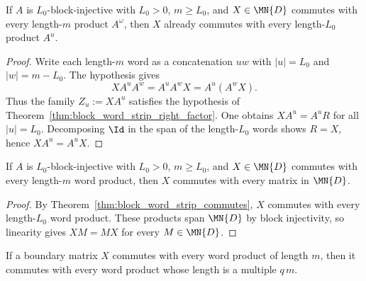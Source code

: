 \begin{theorem}
    \label{thm:block_word_strip_commutes}
    \leanok
    If $A$ is $L_0$-block-injective with $L_0 > 0$, $m \ge L_0$, and
    $X \in \MN{D}$ commutes with every length-$m$ product $A^\omega$, then $X$
    already commutes with every length-$L_0$ product $A^u$.
\end{theorem}

\begin{proof}
    \leanok
    Write each length-$m$ word as a concatenation $uw$ with $|u| = L_0$ and
    $|w| = m - L_0$. The hypothesis gives
    \[
        X A^u A^w = A^u A^w X = A^u (A^w X).
    \]
    Thus the family $Z_u := X A^u$ satisfies the hypothesis of
    Theorem~\ref{thm:block_word_strip_right_factor}. One obtains
    $X A^u = A^u R$ for all $|u| = L_0$. Decomposing $\Id$ in the span of the
    length-$L_0$ words shows $R = X$, hence $X A^u = A^u X$.
\end{proof}

\begin{theorem}
    \label{thm:block_word_strip_central}
    \leanok
    If $A$ is $L_0$-block-injective with $L_0 > 0$, $m \ge L_0$, and
    $X \in \MN{D}$ commutes with every length-$m$ word product, then $X$
    commutes with every matrix in $\MN{D}$.
\end{theorem}

\begin{proof}
    \leanok
    By Theorem~\ref{thm:block_word_strip_commutes}, $X$ commutes with every
    length-$L_0$ word product. These products span $\MN{D}$ by block
    injectivity, so linearity gives $XM = MX$ for every $M \in \MN{D}$.
\end{proof}

\begin{lemma}
    \label{lem:word_commutation_multiple_lengths}
    \leanok
    If a boundary matrix $X$ commutes with every word product of length $m$, then
    it commutes with every word product whose length is a multiple $q\,m$.
\end{lemma}

